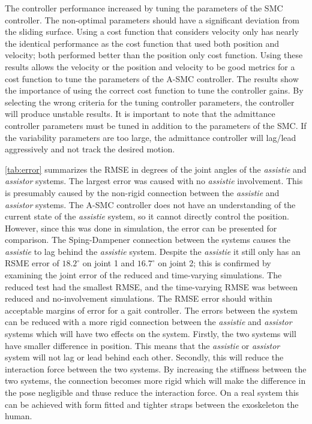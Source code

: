 The controller performance increased by tuning the parameters of the SMC controller. The non-optimal parameters should have a significant deviation from the sliding surface. Using a cost function that considers velocity only has nearly the identical performance as the cost function that used both position and velocity; both performed better than the position only cost function. Using these results allows the velocity or the position and velocity to be good metrics for a cost function to tune the parameters of the A-SMC controller. The results show the importance of using the correct cost function to tune the controller gains. By selecting the wrong criteria for the tuning controller parameters, the controller will produce unstable results. It is important to note that the admittance controller parameters must be tuned in addition to the parameters of the SMC. If the variability parameters are too large, the admittance controller will lag/lead aggressively and not track the desired motion. 

\autoref{tab:error} summarizes the RMSE in degrees of the joint angles of the \textit{assistie} and \textit{assistor} systems. The largest error was caused with no  \textit{assistie} involvement. This is presumably caused by the non-rigid connection between the  \textit{assistie} and \textit{assistor} systems. The A-SMC controller does not have an understanding of the current state of the \textit{assistie} system, so it cannot directly control the position. However, since this was done in simulation, the error can be presented for comparison. The Sping-Dampener connection between the systems causes the \textit{assistie} to lag behind the \textit{assistie} system. Despite the \textit{assistie} it still only has an RSME error of $18.2^{\circ}$ on joint 1 and $16.7^{\circ}$ on joint 2; this is confirmed by examining the joint error of the reduced and time-varying simulations. The reduced test had the smallest RMSE, and the time-varying RMSE was between reduced and no-involvement simulations. The RMSE error should within acceptable margins of error for a gait controller. The errors between the system can be reduced with a more rigid connection between the \textit{assistie} and \textit{assistor} systems which will have two effects on the system. Firstly, the two systems will have smaller difference in position. This means that the \textit{assistie} or \textit{assistor} system will not lag or lead behind each other. Secondly, this will reduce the interaction force between the two systems. By increasing the stiffness between the two systems, the connection becomes more rigid which will make the difference in the pose negligible and thuse reduce the interaction force. On a real system this can be achieved with form fitted and tighter straps between the exoskeleton the human.    


